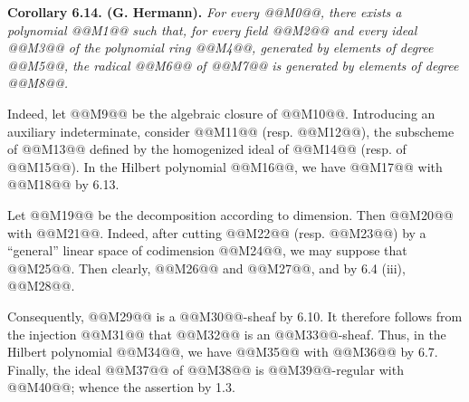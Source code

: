 \textbf{Corollary 6.14. (G. Hermann).} \emph{For every @@M0@@, there exists a polynomial @@M1@@ such that, for every field @@M2@@ and every ideal @@M3@@ of the polynomial ring @@M4@@, generated by elements of degree @@M5@@, the radical @@M6@@ of @@M7@@ is generated by elements of degree @@M8@@.}

Indeed, let @@M9@@ be the algebraic closure of @@M10@@. Introducing an auxiliary indeterminate, consider @@M11@@ (resp. @@M12@@), the subscheme of @@M13@@ defined by the homogenized ideal of @@M14@@ (resp. of @@M15@@). In the Hilbert polynomial @@M16@@, we have @@M17@@ with @@M18@@ by 6.13.

Let @@M19@@ be the decomposition according to dimension. Then @@M20@@ with @@M21@@. Indeed, after cutting @@M22@@ (resp. @@M23@@) by a ``general'' linear space of codimension @@M24@@, we may suppose that @@M25@@. Then clearly, @@M26@@ and @@M27@@, and by 6.4 (iii), @@M28@@.

Consequently, @@M29@@ is a @@M30@@-sheaf by 6.10. It therefore follows from the injection @@M31@@ that @@M32@@ is an @@M33@@-sheaf. Thus, in the Hilbert polynomial @@M34@@, we have @@M35@@ with @@M36@@ by 6.7. Finally, the ideal @@M37@@ of @@M38@@ is @@M39@@-regular with @@M40@@; whence the assertion by 1.3.

